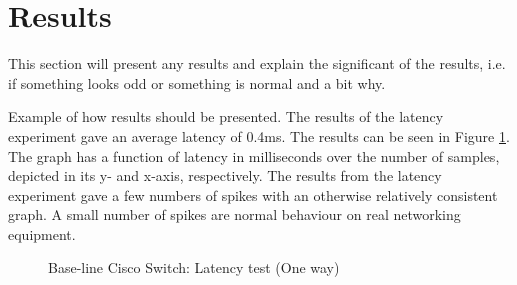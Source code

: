 \section{Results}

This section will present any results and explain the significant of the results, i.e. if something looks odd or something is normal and a bit why.

Example of how results should be presented. The results of the latency experiment gave an average latency of 0.4ms. The results can be seen in Figure \ref{CiscoLat}. The graph has a function of latency in milliseconds over the number of samples, depicted in its y- and x-axis, respectively. The results from the latency experiment gave a few numbers of spikes with an otherwise relatively consistent graph. A small number of spikes are normal behaviour on real networking equipment.


\begin{figure}[H]
    \centering
    \caption{Base-line Cisco Switch: Latency test (One way)}
    \label{CiscoLat}
\end{figure}

